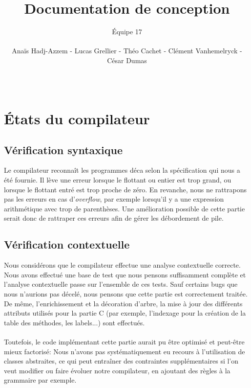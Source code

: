 \documentclass{article}
\title{\vspace{\fill} Documentation de conception \vspace{\fill}}
\author{Équipe 17 \\\\ Anaïs Hadj-Azzem - Lucas Grellier - Théo Cachet - Clément Vanhemelryck - César Dumas}
\date{\\}
\begin{document}
\maketitle
\thispagestyle{empty}
\setcounter{page}{0}
\newpage

\tableofcontents
\thispagestyle{empty}
\newpage

\section{États du compilateur}
\subsection{Vérification syntaxique}
Le compilateur reconnaît les programmes déca selon la spécification qui nous a été fournie. \newline
Il lève une erreur lorsque le flottant ou entier est trop grand, ou lorsque le flottant entré est trop proche de zéro. \newline
En revanche, nous ne rattrapons pas les erreurs en cas d'\textit{overflow}, par exemple lorsqu'il y a une expression arithmétique avec
trop de parenthèses. Une amélioration possible de cette partie serait donc de rattraper ces erreurs afin de gérer les débordement de pile.
\subsection{Vérification contextuelle}
    Nous considérons que le compilateur effectue une analyse contextuelle correcte.
    Nous avons effectué une base de test que nous pensons suffisamment complète et l'analyse contextuelle passe sur l'ensemble de ces tests.
    Sauf certains bugs que nous n'aurions pas décelé, nous pensons que cette partie est correctement traitée.
    De même, l'enrichissement et la décoration d'arbre, la mise à jour des différents attributs utilisés pour la partie C (par exemple, l'indexage pour la création de la table des méthodes, les labels...) sont effectués.
\\\\
    Toutefois, le code implémentant cette partie aurait pu être optimisé et peut-être mieux factorisé: Nous n'avons pas systématiquement eu recours à l'utilisation de classes abstraites, ce qui peut entraîner des contraintes supplémentaires si l'on veut modifier ou faire évoluer notre compilateur, en ajoutant des règles à la grammaire par exemple.
\end{document}
